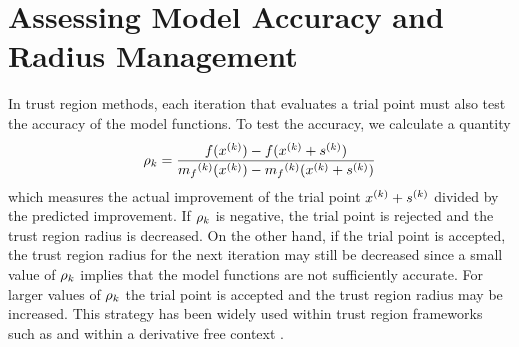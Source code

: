 %
%



\section{Assessing Model Accuracy and Radius Management}
\label{rhosection}
In trust region methods, each iteration that evaluates a trial point must also test the accuracy of the model functions.
To test the accuracy, we calculate a quantity
\begin{align}
\label{define_rhok}
\rho_k = \frac{f(x^{(k)}) - f(x^{(k)}+{{s}^{(k)}})}{{{m}_f}^{(k)}(x^{(k)}) - {{m}_f}^{(k)}(x^{(k)}+{{s}^{(k)}})}
\end{align}
which measures the actual improvement of the trial point $x^{(k)}+{{s}^{(k)}}$ divided by the predicted improvement.  If $\rho_k$ is negative, the trial point is rejected and the trust region radius is decreased.   On the other hand, if the trial point is accepted, the trust region radius for the next iteration may still be decreased since 
a small value of $\rho_k$ implies that the model functions are not sufficiently accurate.   For larger values of $\rho_k$ the trial point is accepted and the trust region radius may be increased.
This strategy has been widely used within trust region frameworks such as \cite{Conn:2000:TM:357813} and within a derivative free context \cite{introduction_book}.


